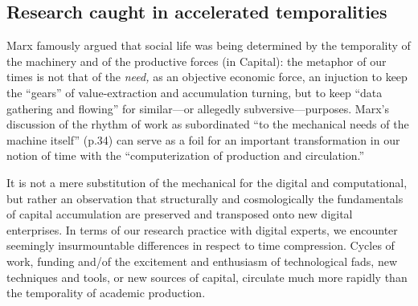 \documentclass[10pt,letter,oneside]{scrartcl}
\begin{document}
   


\subsection*{Research caught in accelerated temporalities} 

Marx famously argued that social life was being determined by the temporality 
of the machinery and of the productive forces (in Capital):
the metaphor of our times is not that of the \emph{need,} as an
objective economic force, an injuction to keep the ``gears'' of
value-extraction and accumulation turning, but to keep ``data
gathering and flowing'' for similar---or allegedly subversive---purposes. 
Marx's discussion of the rhythm of work as subordinated ``to the 
mechanical needs of the machine itself'' \cite{Marx1990} (p.34) can serve 
as a foil for an important transformation in our notion of time with
the ``computerization of production and circulation.'' 

It is not a mere substitution of the mechanical for the digital and
computational, but rather an observation that structurally and
cosmologically the fundamentals of capital accumulation are preserved
and transposed onto new digital enterprises.  In terms of our research
practice with digital experts, we encounter seemingly insurmountable
differences in respect to time compression. Cycles of work, funding
and/of the excitement and enthusiasm of technological fads, new
techniques and tools, or new sources of capital, circulate much more
rapidly than the temporality of academic production.
\end{document}
